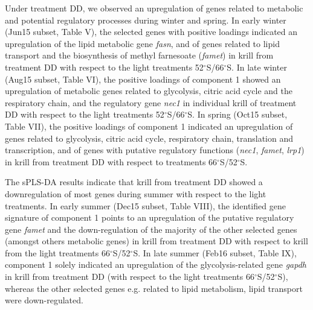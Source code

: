 Under treatment DD, we observed an upregulation of genes related to metabolic
and potential regulatory processes during winter and spring. In early winter
(Jun15 subset, Table V), the selected genes with positive loadings indicated an
upregulation of the lipid metabolic gene \textit{fasn}, and of genes related to
lipid transport and the biosynthesis of methyl farnesoate (\textit{famet}) in
krill from treatment DD with respect to the light treatments
52$^{\circ}$S/66$^{\circ}$S. In late winter (Aug15 subset, Table VI), the
positive loadings of component 1 showed an upregulation of metabolic genes
related to glycolysis, citric acid cycle and the respiratory chain, and the
regulatory gene \textit{nec1} in individual krill of treatment DD with respect
to the light treatments 52$^{\circ}$S/66$^{\circ}$S. In spring (Oct15 subset,
Table VII), the positive loadings of component 1 indicated an upregulation of
genes related to glycolysis, citric acid cycle, respiratory chain, translation
and transcription, and of genes with putative regulatory functions
(\textit{nec1}, \textit{famet}, \textit{lrp1}) in krill from treatment DD with
respect to treatments 66$^{\circ}$S/52$^{\circ}$S.

The sPLS-DA results indicate that krill from treatment DD showed a
downregulation of most genes during summer with respect to the light
treatments. In early summer (Dec15 subset, Table VIII), the identified gene
signature of component 1 points to an upregulation of the putative regulatory
gene \textit{famet} and the down-regulation of the majority of the other
selected genes (amongst others metabolic genes) in krill from treatment DD with
respect to krill from the light treatments 66$^{\circ}$S/52$^{\circ}$S. In late
summer (Feb16 subset, Table IX), component 1 solely indicated an upregulation
of the glycolysis-related gene \textit{gapdh} in krill from treatment DD (with
respect to the light treatments 66$^{\circ}$S/52$^{\circ}$S), whereas the other
selected genes e.g. related to lipid metabolism, lipid transport were
down-regulated.

